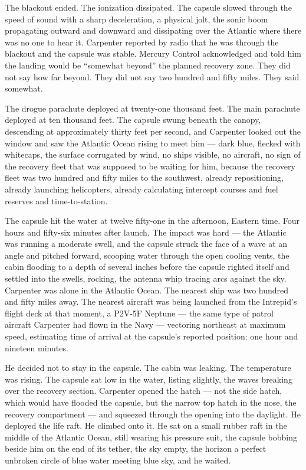 \documentclass[12pt, letterpaper]{article}
\begin{document}
The blackout ended. The ionization dissipated. The capsule slowed through the speed of sound with a sharp deceleration, a physical jolt, the sonic boom propagating outward and downward and dissipating over the Atlantic where there was no one to hear it. Carpenter reported by radio that he was through the blackout and the capsule was stable. Mercury Control acknowledged and told him the landing would be ``somewhat beyond'' the planned recovery zone. They did not say how far beyond. They did not say two hundred and fifty miles. They said somewhat.

The drogue parachute deployed at twenty-one thousand feet. The main parachute deployed at ten thousand feet. The capsule swung beneath the canopy, descending at approximately thirty feet per second, and Carpenter looked out the window and saw the Atlantic Ocean rising to meet him --- dark blue, flecked with whitecaps, the surface corrugated by wind, no ships visible, no aircraft, no sign of the recovery fleet that was supposed to be waiting for him, because the recovery fleet was two hundred and fifty miles to the southwest, already repositioning, already launching helicopters, already calculating intercept courses and fuel reserves and time-to-station.

The capsule hit the water at twelve fifty-one in the afternoon, Eastern time. Four hours and fifty-six minutes after launch. The impact was hard --- the Atlantic was running a moderate swell, and the capsule struck the face of a wave at an angle and pitched forward, scooping water through the open cooling vents, the cabin flooding to a depth of several inches before the capsule righted itself and settled into the swells, rocking, the antenna whip tracing arcs against the sky. Carpenter was alone in the Atlantic Ocean. The nearest ship was two hundred and fifty miles away. The nearest aircraft was being launched from the Intrepid's flight deck at that moment, a P2V-5F Neptune --- the same type of patrol aircraft Carpenter had flown in the Navy --- vectoring northeast at maximum speed, estimating time of arrival at the capsule's reported position: one hour and nineteen minutes.

He decided not to stay in the capsule. The cabin was leaking. The temperature was rising. The capsule sat low in the water, listing slightly, the waves breaking over the recovery section. Carpenter opened the hatch --- not the side hatch, which would have flooded the capsule, but the narrow top hatch in the nose, the recovery compartment --- and squeezed through the opening into the daylight. He deployed the life raft. He climbed onto it. He sat on a small rubber raft in the middle of the Atlantic Ocean, still wearing his pressure suit, the capsule bobbing beside him on the end of its tether, the sky empty, the horizon a perfect unbroken circle of blue water meeting blue sky, and he waited.
\end{document}
